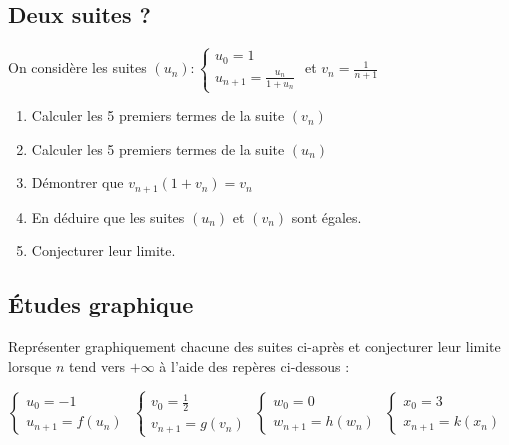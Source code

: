 \documentclass[oneside,12pt]{article}          %
\begin{document}
\subsection{Deux suites ?}
On considère les suites $(u_n):\begin{cases}u_0=1\\u_{n+1}=\frac{u_n}{1+u_n}\end{cases}$ et $v_n=\frac{1}{n+1}$

\begin{enumerate}
	\item Calculer les 5 premiers termes de la suite $(v_n)$
	\item Calculer les 5 premiers termes de la suite $(u_n)$
	\item Démontrer que $v_{n+1}(1+v_n)=v_n$
	\item En déduire que les suites $(u_n)$ et $(v_n)$ sont égales.
	\item Conjecturer leur limite.
\end{enumerate}


\subsection{Études graphique}
Représenter graphiquement chacune des suites ci-après et conjecturer leur limite lorsque $n$ tend vers $+\infty$ à l'aide des repères ci-dessous :

$\begin{cases}u_0=-1\\u_{n+1}=f(u_n)\end{cases}$ \qquad
$\begin{cases}v_0=\frac{1}{2}\\v_{n+1}=g(v_n)\end{cases}$ \qquad
$\begin{cases}w_0=0\\w_{n+1}=h(w_n)\end{cases}$ \qquad
$\begin{cases}x_0=3\\x_{n+1}=k(x_n)\end{cases}$
\end{document}

